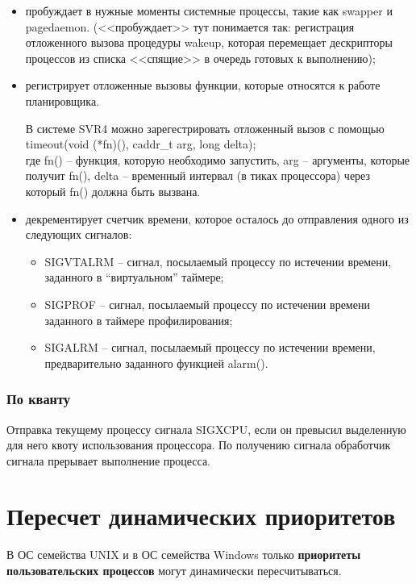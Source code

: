 \begin{itemize}[label=---]
	\item пробуждает в нужные моменты системные процессы, такие как swapper и pagedaemon. (<<пробуждает>> тут понимается так: регистрация отложенного вызова процедуры wakeup, которая перемещает дескрипторы процессов из списка <<спящие>> в очередь готовых к выполнению);
	\item регистрирует отложенные вызовы функции, которые относятся к работе планировщика.
	
	В системе SVR4 можно зарегестрировать отложенный вызов с помощью \\ timeout(void (*fn)(), caddr\_t arg, long delta); \\где fn() -- функция, которую необходимо запустить, arg -- аргументы, которые получит fn(), delta -- временный интервал (в тиках процессора) через который fn() должна быть вызвана.
	
	\item декрементирует счетчик времени, которое осталось до отправления одного из следующих сигналов:
	\begin{itemize}
		\item SIGVTALRM – сигнал, посылаемый процессу по истечении времени, заданного в “виртуальном” таймере;
		\item SIGPROF – сигнал, посылаемый процессу по истечении времени заданного в таймере профилирования;
		\item SIGALRM – сигнал, посылаемый процессу по истечении времени, предварительно заданного функцией alarm().	
	\end{itemize}
\end{itemize}

\subsection*{По кванту}

Отправка текущему процессу сигнала SIGXCPU, если он превысил выделенную для него квоту использования процессора. По получению сигнала обработчик сигнала прерывает выполнение процесса.


\chapter{Пересчет динамических приоритетов}

В ОС семейства UNIX и в ОС семейства Windows только \textbf{приоритеты пользовательских 	процессов} могут динамически пересчитываться.

